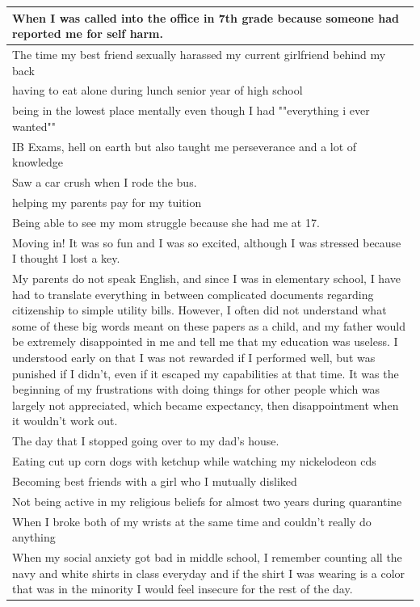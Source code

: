 \documentclass[
  .7em,
  letterpaper,
  DIV=11,
  numbers=noendperiod]{scrartcl}
\begin{document}
\begin{table}
\begin{tabular}{l}
\hline
When I was called into the office in 7th grade because someone had reported me for self harm.\\
\hline
The time my best friend sexually harassed my current girlfriend behind my back\\
\hline
having to eat alone during lunch senior year of high school\\
\hline
being in the lowest place mentally even though I had ""everything i ever wanted""\\
\hline
IB Exams, hell on earth but also taught me perseverance and a lot of knowledge\\
\hline
Saw a car crush when I rode the bus.\\
\hline
helping my parents pay for my tuition\\
\hline
Being able to see my mom struggle because she had me at 17.\\
\hline
Moving in! It was so fun and I was so excited, although I was stressed because I thought I lost a key.\\
\hline
My parents do not speak English, and since I was in elementary school, I have had to translate everything in between complicated documents regarding citizenship to simple utility bills. However, I often did not understand what some of these big words meant on these papers as a child, and my father would be extremely disappointed in me and tell me that my education was useless. I understood early on that I was not rewarded if I performed well, but was punished if I didn't, even if it escaped my capabilities at that time. It was the beginning of my frustrations with doing things for other people which was largely not appreciated, which became expectancy, then disappointment when it wouldn't work out.\\
\hline
The day that I stopped going over to my dad's house.\\
\hline
Eating cut up corn dogs with ketchup while watching my nickelodeon cds\\
\hline
Becoming best friends with a girl who I mutually disliked\\
\hline
Not being active in my religious beliefs for almost two years during quarantine\\
\hline
When I broke both of my wrists at the same time and couldn't really do anything\\
\hline
When my social anxiety got bad in middle school, I remember counting all the navy and white shirts in class everyday and if the shirt I was wearing is a color that was in the minority I would feel insecure for the rest of the day.\\

\end{tabular}
\end{table}
\end{document}
